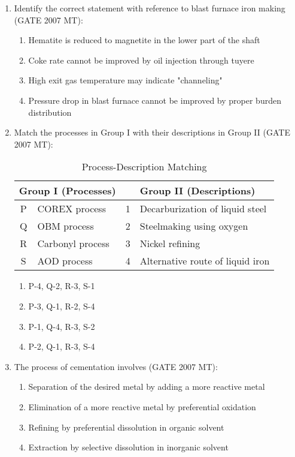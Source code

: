 \documentclass[12pt]{article}
\begin{document}
\begin{enumerate}
\item Identify the correct statement with reference to blast furnace iron making (GATE 2007 MT):  
  \begin{enumerate}[label=(\Alph*)]
    \item Hematite is reduced to magnetite in the lower part of the shaft
    \item Coke rate cannot be improved by oil injection through tuyere
    \item High exit gas temperature may indicate "channeling"
    \item Pressure drop in blast furnace cannot be improved by proper burden distribution
  \end{enumerate}


\item Match the processes in Group I with their descriptions in Group II (GATE 2007 MT):\\[1ex]
\begin{table}[h!]
\centering
\caption{Process-Description Matching}
\label{tab:q52_matching}
\begin{tabular}{|c|l||c|l|}
\hline
\multicolumn{2}{|c||}{\textbf{Group I (Processes)}} & \multicolumn{2}{c|}{\textbf{Group II (Descriptions)}} \\
\hline
P & COREX process        & 1 & Decarburization of liquid steel \\
Q & OBM process          & 2 & Steelmaking using oxygen \\
R & Carbonyl process     & 3 & Nickel refining \\
S & AOD process          & 4 & Alternative route of liquid iron \\
\hline
\end{tabular}
\end{table}
  \begin{enumerate}[label=(\Alph*)]
    \item P-4, Q-2, R-3, S-1
    \item P-3, Q-1, R-2, S-4
    \item P-1, Q-4, R-3, S-2
    \item P-2, Q-1, R-3, S-4
  \end{enumerate}

\item The process of cementation involves (GATE 2007 MT):  
  \begin{enumerate}[label=(\Alph*)]
    \item Separation of the desired metal by adding a more reactive metal
    \item Elimination of a more reactive metal by preferential oxidation
    \item Refining by preferential dissolution in organic solvent
    \item Extraction by selective dissolution in inorganic solvent
  \end{enumerate}


\end{enumerate}
\end{document}
